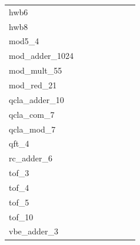 \begin{table}[htbp]
\begin{tabular}{l|rr|rr|rr|r}
hwb6            &     &        &     &        &     &        &        \\
hwb8            &     &        &     &        &     &        &        \\
mod5\_4          &     &        &     &        &     &        &        \\
mod\_adder\_1024  &     &        &     &        &     &        &        \\
mod\_mult\_55     &     &        &     &        &     &        &        \\
mod\_red\_21      &     &        &     &        &     &        &        \\
qcla\_adder\_10   &     &        &     &        &     &        &        \\
qcla\_com\_7      &     &        &     &        &     &        &        \\
qcla\_mod\_7      &     &        &     &        &     &        &        \\
qft\_4           &     &        &     &        &     &        &        \\
rc\_adder\_6      &     &        &     &        &     &        &        \\
tof\_3           &     &        &     &        &     &        &        \\
tof\_4           &     &        &     &        &     &        &        \\
tof\_5           &     &        &     &        &     &        &        \\
tof\_10          &     &        &     &        &     &        &        \\
vbe\_adder\_3     &     &        &     &        &     &        &        \\
\hline
\end{tabular}
\end{table}
